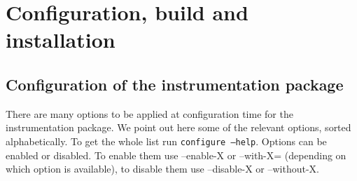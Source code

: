 \chapter{Configuration, build and installation}\label{cha:Configuration}

\section{Configuration of the instrumentation package}

There are many options to be applied at configuration time for the instrumentation package. We point out here some of the relevant options, sorted alphabetically. To get the whole list run {\tt configure --help}. Options can be enabled or disabled. To enable them use --enable-X or --with-X= (depending on which option is available), to disable them use --disable-X or --without-X.

